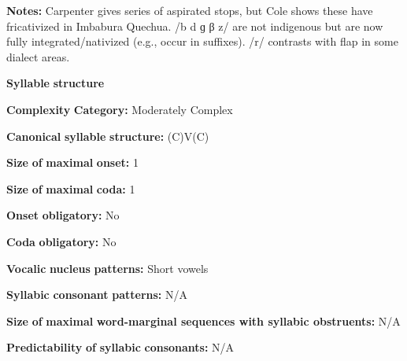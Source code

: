 \documentclass[output=paper]{langsci/langscibook}
\begin{document}
\begin{styleBody}
\textbf{Notes:} Carpenter gives series of aspirated stops, but Cole shows these have fricativized in Imbabura Quechua. /b d ɡ β z/ are not indigenous but are now fully integrated/nativized (e.g., occur in suffixes). /r/ contrasts with flap in some dialect areas.
\end{styleBody}

\begin{styleBody}
\textbf{Syllable} \textbf{structure}
\end{styleBody}

\begin{styleBody}
\textbf{Complexity} \textbf{Category:} Moderately Complex
\end{styleBody}

\begin{styleBody}
\textbf{Canonical} \textbf{syllable} \textbf{structure:} (C)V(C) \citep[203-5]{Cole1982}
\end{styleBody}

\begin{styleBody}
\textbf{Size} \textbf{of} \textbf{maximal} \textbf{onset:} 1
\end{styleBody}

\begin{styleBody}
\textbf{Size} \textbf{of} \textbf{maximal} \textbf{coda:} 1
\end{styleBody}

\begin{styleBody}
\textbf{Onset} \textbf{obligatory:} No
\end{styleBody}

\begin{styleBody}
\textbf{Coda} \textbf{obligatory:} No
\end{styleBody}

\begin{styleBody}
\textbf{Vocalic} \textbf{nucleus} \textbf{patterns:} Short vowels
\end{styleBody}

\begin{styleBody}
\textbf{Syllabic} \textbf{consonant} \textbf{patterns:} N/A
\end{styleBody}

\begin{styleBody}
\textbf{Size} \textbf{of} \textbf{maximal} \textbf{word{}-marginal sequences with syllabic obstruents:} N/A
\end{styleBody}

\begin{styleBody}
\textbf{Predictability} \textbf{of} \textbf{syllabic} \textbf{consonants:} N/A
\end{styleBody}
\end{document}
